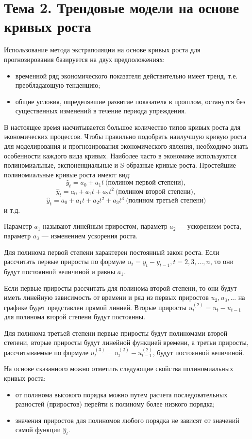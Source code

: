 \section{Тема 2. Трендовые модели на основе кривых роста}

Использование метода экстраполяции на основе кривых роста для прогнозирования базируется на двух предположениях:
\begin{itemize}
	\item временной ряд экономического показателя действительно имеет тренд, т.е. преобладающую тенденцию;
	\item общие условия, определявшие развитие показателя в прошлом, останутся без существенных изменений в течение периода упреждения.
\end{itemize}

В настоящее время насчитывается большое количество типов кривых роста для экономических процессов. Чтобы правильно подобрать наилучшую кривую роста для моделирования и прогнозирования экономического явления, необходимо знать особенности каждого вида кривых. Наиболее часто в экономике используются полиномиальные, экспоненциальные и S-образные кривые роста. Простейшие полиномиальные кривые роста имеют вид:
\[ \hat{y}_t = a_0 + a_1t \ \text{(полином первой степени)},\]
\[ \hat{y}_t = a_0 + a_1t +a_2t^2 \ \text{(полином второй степени)},\]
\[ \hat{y}_t = a_0 + a_1t +a_2t^2 + a_3t^3 \ \text{(полином третьей степени)}\]
и т.д.

Параметр $a_1$ называют линейным приростом, параметр $a_2$ --- ускорением роста, параметр $a_3$ --- изменением ускорения роста.

Для полинома первой степени характерен постоянный закон роста. Если рассчитать первые приросты по формуле $u_t = y_t - y_{t-1}, t = 2, 3, ..., n$, то они будут постоянной величиной и равны $a_1$.

Если первые приросты рассчитать для полинома второй степени, то они будут иметь линейную зависимость от времени и ряд из первых приростов $u_2, u_3, ...$ на графике будет представлен прямой линией. Вторые приросты $u_t^{(2)} = u_t - u_{t-1}$ для полинома второй степени будут постоянны.

Для полинома третьей степени первые приросты будут полиномами второй степени, вторые приросты будут линейной функцией времени, а третьи приросты, рассчитываемые по формуле $u_t^{(3)} = u_t^{(2)} - u_{t-1}^{(2)}$, будут постоянной величиной.

На основе сказанного можно отметить следующие свойства полиномиальных кривых роста:
\begin{itemize}
	\item от полинома высокого порядка можно путем расчета последовательных разностей (приростов) перейти к полиному более низкого порядка;
	\item значения приростов для полиномов любого порядка не зависят от значений самой функции $\hat{y}_t$.
\end{itemize}

